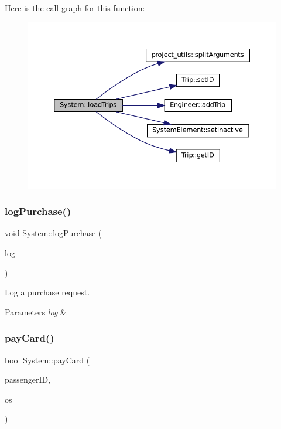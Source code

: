 Here is the call graph for this function\+:
\nopagebreak
\begin{figure}[H]
\begin{center}
\leavevmode
\includegraphics[width=350pt]{classSystem_a437952e6a2cde86e17a747c0e5500d2b_cgraph}
\end{center}
\end{figure}
\mbox{\label{classSystem_a3d823d755bcbc5843dd261b88693bc69}} 
\subsubsection{\texorpdfstring{log\+Purchase()}{logPurchase()}}
{\footnotesize\ttfamily void System\+::log\+Purchase (\begin{DoxyParamCaption}\item[{\mbox{\hyperlink{classPurchaseLog}{Purchase\+Log}}}]{log }\end{DoxyParamCaption})}



Log a purchase request. 


\begin{DoxyParams}{Parameters}
{\em log} & \\
\hline
\end{DoxyParams}
\mbox{\label{classSystem_a93e28750e7677d09a7eb2acfc2590209}} 
\subsubsection{\texorpdfstring{pay\+Card()}{payCard()}}
{\footnotesize\ttfamily bool System\+::pay\+Card (\begin{DoxyParamCaption}\item[{\mbox{\hyperlink{project__utils_8h_a8f3a969054ad2200720b96e7e23dd4e1}{id\+\_\+t}}}]{passenger\+ID,  }\item[{std\+::ostream \&}]{os }\end{DoxyParamCaption})}



